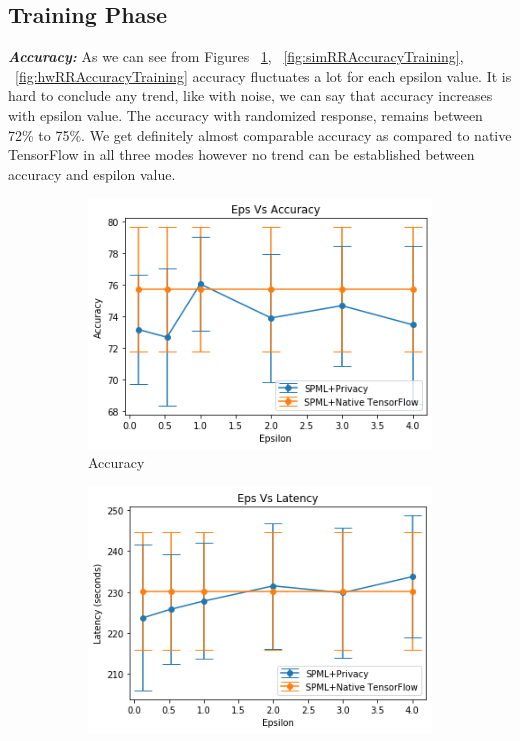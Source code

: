 \subsection{Training Phase}
\textbf{\textit{Accuracy: }} As we can see from Figures ~\ref{fig:nativeRRAccuracyTraining}, ~\ref{fig:simRRAccuracyTraining}, ~\ref{fig:hwRRAccuracyTraining} accuracy fluctuates a lot for each epsilon value. It is hard to conclude any trend, like with noise, we can say that accuracy increases with epsilon value. The accuracy with randomized response, remains between 72\% to 75\%. We get definitely almost comparable accuracy as compared to native TensorFlow in all three modes however no trend can be established between accuracy and espilon value.
\begin{figure}
     \begin{subfigure}{0.5\textwidth}
         \includegraphics[width=\textwidth]{images/Training/RRAccuracy.png}
         \caption{Accuracy}
         \label{fig:nativeRRAccuracyTraining}
     \end{subfigure}
     \begin{subfigure}{0.5\textwidth}
         \includegraphics[width=\textwidth]{images/Training/RRLatency.png}

\end{subfigure}
\end{figure}

